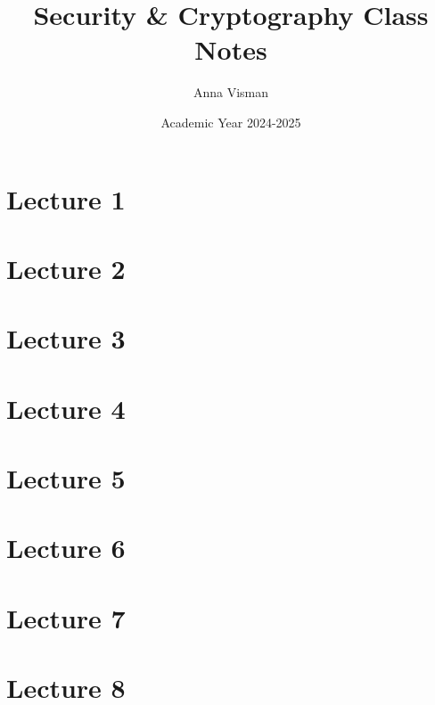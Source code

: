 \documentclass[10pt, oneside]{article}
\title{Security \& Cryptography Class Notes}
\author{Anna Visman}
\date{Academic Year 2024-2025}
\begin{document}
\maketitle
\tableofcontents

\vspace{.25in}

\newpage 
\section{Lecture 1}



\newpage

\section{Lecture 2}



\newpage

\section{Lecture 3}



\newpage

\section{Lecture 4}



\newpage

\section{Lecture 5}



\newpage

\section{Lecture 6}



\newpage

\section{Lecture 7}



\newpage

\section{Lecture 8}


\end{document}
